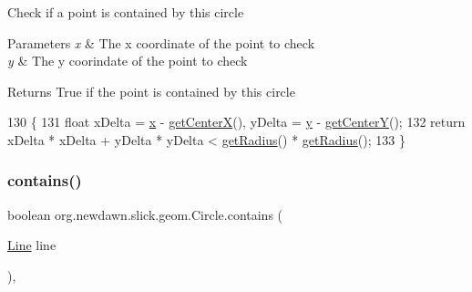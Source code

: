 Check if a point is contained by this circle


\begin{DoxyParams}{Parameters}
{\em x} & The x coordinate of the point to check \\
\hline
{\em y} & The y coorindate of the point to check \\
\hline
\end{DoxyParams}
\begin{DoxyReturn}{Returns}
True if the point is contained by this circle 
\end{DoxyReturn}

\begin{DoxyCode}
130     \{ 
131         \textcolor{keywordtype}{float} xDelta = \mbox{\hyperlink{classorg_1_1newdawn_1_1slick_1_1geom_1_1_shape_a3e985bfff386c15a4efaad03d8ad60d3}{x}} - \mbox{\hyperlink{classorg_1_1newdawn_1_1slick_1_1geom_1_1_circle_a54401470f8ee5f99c2013ca06e7cb057}{getCenterX}}(), yDelta = \mbox{\hyperlink{classorg_1_1newdawn_1_1slick_1_1geom_1_1_shape_a9f934baded6a1b65ebb69e7e5f80ea00}{y}} - \mbox{\hyperlink{classorg_1_1newdawn_1_1slick_1_1geom_1_1_circle_a3e64722eb886a7936ce75199e94e1e48}{getCenterY}}();
132         \textcolor{keywordflow}{return} xDelta * xDelta + yDelta * yDelta < \mbox{\hyperlink{classorg_1_1newdawn_1_1slick_1_1geom_1_1_circle_a3d83f7477c608a767ced2622440a528a}{getRadius}}() * 
      \mbox{\hyperlink{classorg_1_1newdawn_1_1slick_1_1geom_1_1_circle_a3d83f7477c608a767ced2622440a528a}{getRadius}}();
133     \}
\end{DoxyCode}
\mbox{\label{classorg_1_1newdawn_1_1slick_1_1geom_1_1_circle_a67d90e13c2e9de9c96931295bba962d6}} 
\subsubsection{\texorpdfstring{contains()}{contains()}\hspace{0.1cm}{\footnotesize\ttfamily [2/2]}}
{\footnotesize\ttfamily boolean org.\+newdawn.\+slick.\+geom.\+Circle.\+contains (\begin{DoxyParamCaption}\item[{\mbox{\hyperlink{classorg_1_1newdawn_1_1slick_1_1geom_1_1_line}{Line}}}]{line }\end{DoxyParamCaption})\hspace{0.3cm}{\ttfamily [inline]}, {\ttfamily [private]}}

